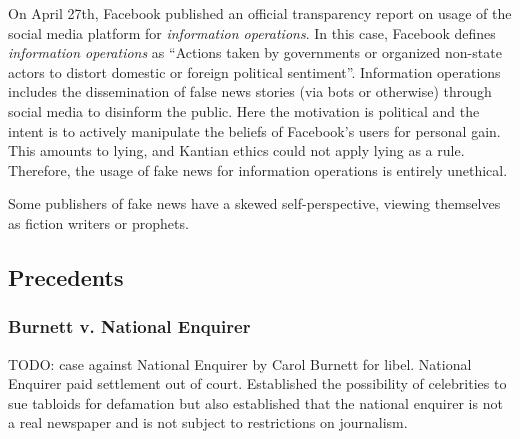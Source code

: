 \par On April 27th, Facebook published an official transparency report on usage of the social media platform for \emph{information operations}. In this case, Facebook defines \emph{information operations} as ``Actions taken by governments or organized non-state
actors to distort domestic or foreign political sentiment''. \cite{fb_info_ops} Information operations includes the dissemination of false news stories (via bots or otherwise) through social media to disinform the public. Here the motivation is political and the intent is to actively manipulate the beliefs of Facebook's users for personal gain. This amounts to lying, and Kantian ethics could not apply lying as a rule. \cite{kant} Therefore, the usage of fake news for information operations is entirely unethical.

\par Some publishers of fake news have a skewed self-perspective, viewing themselves as fiction writers or prophets. \cite{cbs_fake_news}


\subsection{Precedents}

\subsubsection{Burnett v. National Enquirer}

\par TODO: case against National Enquirer by Carol Burnett for libel. National Enquirer paid settlement out of court. Established the possibility of celebrities to sue tabloids for defamation but also established that the national enquirer is not a real newspaper and is not subject to restrictions on journalism.
\cite{burnett_v_ne}
